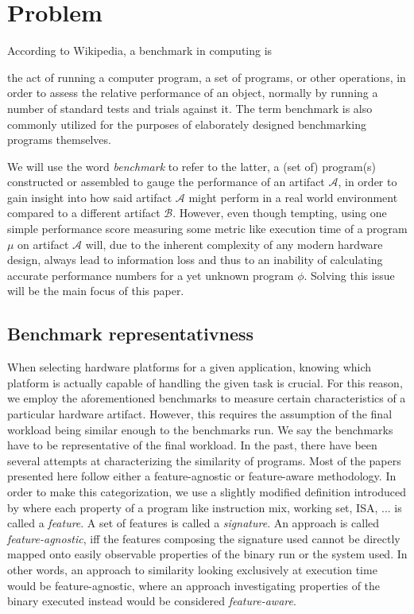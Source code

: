 \documentclass[../bachelor_paper.tex]{subfiles}
\begin{document}
\chapter{Problem}
	\label{ch:prob}

According to Wikipedia, a benchmark in computing is
\begin{displayquote}
the act of running a computer program, a set of programs, or other operations, in order to assess the relative performance of an object, normally by running a number of standard tests and trials against it. The term benchmark is also commonly utilized for the purposes of elaborately designed benchmarking programs themselves. \cite{BenchmarkComputing2021}
\end{displayquote}
We will use the word \emph{benchmark} to refer to the latter, a (set of) program(s) constructed or assembled to gauge the performance of an artifact $\mathcal{A}$, in order to gain insight into how said artifact $\mathcal{A}$ might perform in a real world environment compared to a different artifact $\mathcal{B}$. However, even though tempting, using one simple performance score measuring some metric like execution time of a program $\mu$ on artifact $\mathcal{A}$ will, due to the inherent complexity of any modern hardware design, always lead to information loss and thus to an inability of calculating accurate performance numbers for a yet unknown program $\phi$. Solving this issue will be the main focus of this paper.

\section{Benchmark representativness}
	\label{prob/repr}
When selecting hardware platforms for a given application, knowing which platform is actually capable of handling the given task is crucial. For this reason, we employ the aforementioned benchmarks to measure certain characteristics of a particular hardware artifact. However, this requires the assumption of the final workload being similar enough to the benchmarks run. We say the benchmarks have to be representative of the final workload. In the past, there have been several attempts at characterizing the similarity of programs. Most of the papers presented here follow either a feature-agnostic or feature-aware methodology. In order to make this categorization, we use a slightly modified definition introduced by \cite{cammarotaOptimizingProgramPerformance2013} where each property of a program like instruction mix, working set, \ac{ISA}, ... is called a \emph{feature}. A set of features is called a \emph{signature}. An approach is called \emph{feature-agnostic}, iff the features composing the signature used cannot be directly mapped onto easily observable properties of the binary run or the system used. In other words, an approach to similarity looking exclusively at execution time would be feature-agnostic, where an approach investigating properties of the binary executed instead would be considered \emph{feature-aware}.
\end{document}
